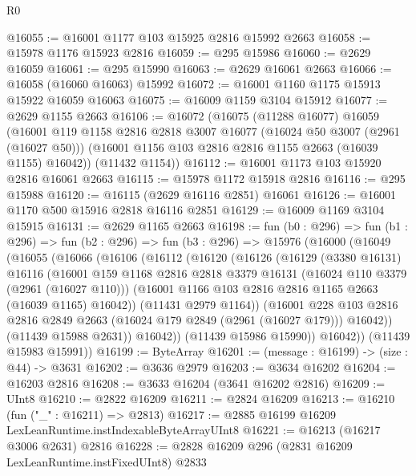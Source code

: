 \begin{lexlean}{R0}
\begin{coremodule}
@16055 := @16001 @1177 @103 @15925 @2816 @15992 @2663
@16058 := @15978 @1176 @15923 @2816
@16059 := @295 @15986
@16060 := @2629 @16059
@16061 := @295 @15990
@16063 := @2629 @16061 @2663
@16066 := @16058 (@16060 @16063) @15992
@16072 := @16001 @1160 @1175 @15913 @15922 @16059 @16063
@16075 := @16009 @1159 @3104 @15912
@16077 := @2629 @1155 @2663
@16106 := @16072
    (@16075
      (@11288 @16077)
      @16059
      (@16001
        @119
        @1158
        @2816
        @2818
        @3007
        @16077
        (@16024 @50 @3007 (@2961 (@16027 @50)))
        (@16001 @1156 @103 @2816 @2816 @1155 @2663 (@16039 @1155) @16042))
      (@11432 @1154))
@16112 := @16001 @1173 @103 @15920 @2816 @16061 @2663
@16115 := @15978 @1172 @15918 @2816
@16116 := @295 @15988
@16120 := @16115 (@2629 @16116 @2851) @16061
@16126 := @16001 @1170 @500 @15916 @2818 @16116 @2851
@16129 := @16009 @1169 @3104 @15915
@16131 := @2629 @1165 @2663
@16198 := fun (b0 : @296) =>
  fun (b1 : @296) =>
  fun (b2 : @296) =>
  fun (b3 : @296) =>
  @15976
    (@16000
      (@16049
        (@16055
          (@16066
            (@16106
              (@16112
                (@16120
                  (@16126
                    (@16129
                      (@3380 @16131)
                      @16116
                      (@16001
                        @159
                        @1168
                        @2816
                        @2818
                        @3379
                        @16131
                        (@16024 @110 @3379 (@2961 (@16027 @110)))
                        (@16001 @1166 @103 @2816 @2816 @1165 @2663 (@16039 @1165) @16042))
                      (@11431 @2979 @1164))
                    (@16001
                      @228
                      @103
                      @2816
                      @2816
                      @2849
                      @2663
                      (@16024 @179 @2849 (@2961 (@16027 @179)))
                      @16042))
                  (@11439 @15988 @2631))
                @16042))
            (@11439 @15986 @15990))
          @16042))
      (@11439 @15983 @15991))
@16199 := ByteArray
@16201 := (message : @16199) -> (size : @44) -> @3631
@16202 := @3636 @2979
@16203 := @3634 @16202
@16204 := @16203 @2816
@16208 := @3633 @16204 (@3641 @16202 @2816)
@16209 := UInt8
@16210 := @2822 @16209
@16211 := @2824 @16209
@16213 := @16210 (fun ("_" : @16211) => @2813)
@16217 := @2885 @16199 @16209 LexLeanRuntime.instIndexableByteArrayUInt8
@16221 := @16213 (@16217 @3006 @2631) @2816
@16228 := @2828 @16209 @296 (@2831 @16209 LexLeanRuntime.instFixedUInt8) @2833

\end{coremodule}
\end{lexlean}
